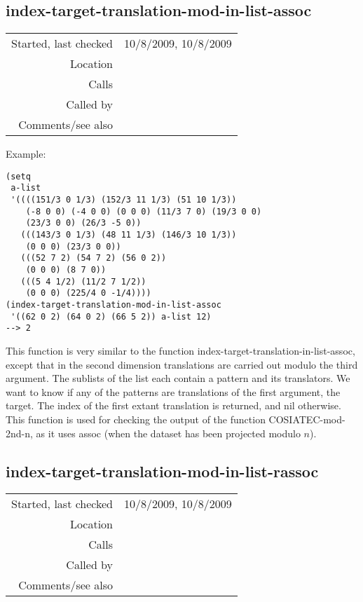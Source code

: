 \subsection*{index-target-translation-mod-in-list-assoc}\label{fun:index-target-translation-mod-in-list-assoc}

\vspace{0.3cm}
\begin{tabular}{r|p{8cm}}
Started, last checked & 10/8/2009, 10/8/2009 \\
Location & \nameref{sec:evaluation-for-SIA+} \\
Calls & \nameref{fun:test-translation-mod-2nd-n} \\
Called by & \nameref{fun:number-of-targets-trans-mod-in-list-assoc} \\
Comments/see also &
\end{tabular}

\vspace{0.5cm}
\noindent Example:
\begin{verbatim}
(setq
 a-list
 '((((151/3 0 1/3) (152/3 11 1/3) (51 10 1/3))
    (-8 0 0) (-4 0 0) (0 0 0) (11/3 7 0) (19/3 0 0) 
    (23/3 0 0) (26/3 -5 0))
   (((143/3 0 1/3) (48 11 1/3) (146/3 10 1/3))
    (0 0 0) (23/3 0 0))
   (((52 7 2) (54 7 2) (56 0 2))
    (0 0 0) (8 7 0))
   (((5 4 1/2) (11/2 7 1/2))
    (0 0 0) (225/4 0 -1/4))))
(index-target-translation-mod-in-list-assoc
 '((62 0 2) (64 0 2) (66 5 2)) a-list 12)
--> 2
\end{verbatim}

\noindent This function is very similar to the
function index-target-translation-in-list-assoc,
except that in the second dimension translations are
carried out modulo the third argument. The sublists of
the list each contain a pattern and its translators.
We want to know if any of the patterns are
translations of the first argument, the target. The
index of the first extant translation is returned, and
nil otherwise. This function is used for checking the
output of the function COSIATEC-mod-2nd-n, as it uses
assoc (when the dataset has been projected modulo
$n$).


\subsection*{index-target-translation-mod-in-list-rassoc}\label{fun:index-target-translation-mod-in-list-rassoc}

\vspace{0.3cm}
\begin{tabular}{r|p{8cm}}
Started, last checked & 10/8/2009, 10/8/2009 \\
Location & \nameref{sec:evaluation-for-SIA+} \\
Calls & \nameref{fun:test-translation-mod-2nd-n} \\
Called by & \nameref{fun:number-of-targets-trans-mod-in-list-rassoc} \\
Comments/see also &
\end{tabular}

